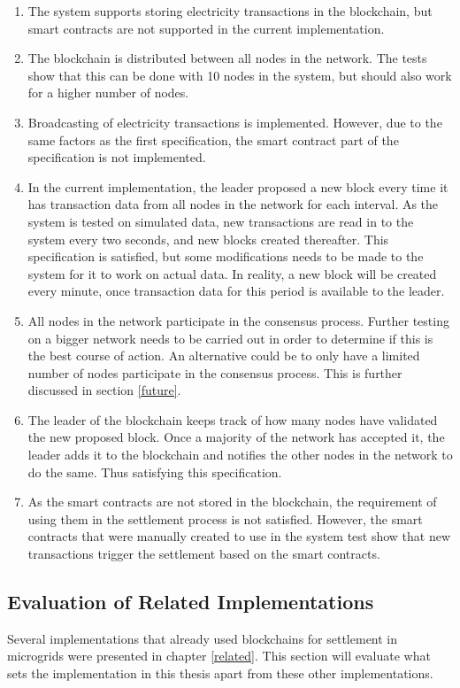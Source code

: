 \begin{enumerate}
\item The system supports storing electricity transactions in the blockchain, but smart contracts are not supported in the current implementation.
\item The blockchain is distributed between all nodes in the network. The tests show that this can be done with 10 nodes in the system, but should also work for a higher number of nodes. 
\item Broadcasting of electricity transactions is implemented. However, due to the same factors as the first specification, the smart contract part of the specification is not implemented.
\item In the current implementation, the leader proposed a new block every time it has transaction data from all nodes in the network for each interval. As the system is tested on simulated data, new transactions are read in to the system every two seconds, and new blocks created thereafter. This specification is satisfied, but some modifications needs to be made to the system for it to work on actual data. In reality, a new block will be created every minute, once transaction data for this period is available to the leader. 
\item All nodes in the network participate in the consensus process. Further testing on a bigger network needs to be carried out in order to determine if this is the best course of action. An alternative could be to only have a limited number of nodes participate in the consensus process. This is further discussed in section \ref{future}.
\item The leader of the blockchain keeps track of how many nodes have validated the new proposed block. Once a majority of the network has accepted it, the leader adds it to the blockchain and notifies the other nodes in the network to do the same. Thus satisfying this specification.
\item As the smart contracts are not stored in the blockchain, the requirement of using them in the settlement process is not satisfied. However, the smart contracts that were manually created to use in the system test show that new transactions trigger the settlement based on the smart contracts.
\end{enumerate}

\subsection{Evaluation of Related Implementations}
Several implementations that already used blockchains for settlement in microgrids were presented in chapter \ref{related}. This section will evaluate what sets the implementation in this thesis apart from these other implementations. 


